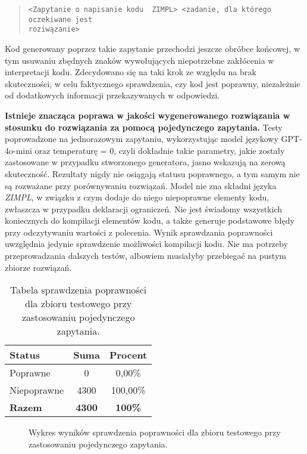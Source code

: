 \begin{quote}
\begin{verbatim}
<Zapytanie o napisanie kodu  ZIMPL> <zadanie, dla którego oczekiwane jest
roziwązanie>
\end{verbatim}
\end{quote}

Kod generowany poprzez takie zapytanie przechodzi jeszcze obróbce końcowej, w tym usuwaniu zbędnych znaków wywołujących niepotrzebne zakłócenia w interpretacji kodu. Zdecydowano się na taki krok ze względu na brak skuteczności, w celu faktycznego sprawdzenia, czy kod jest poprawny, niezależnie od dodatkowych informacji przekazywanych w odpowiedzi.

\textbf{Istnieje znacząca poprawa w jakości wygenerowanego rozwiązania w stosunku do rozwiązania za pomocą pojedynczego zapytania.} Testy poprowadzone na jednorazowym zapytaniu, wykorzystując model językowy GPT-4o-mini oraz temperaturę = 0, czyli dokładnie takie parametry, jakie zostały zastosowane w przypadku stworzonego generatora, jasno wskazują na zerową skuteczność. Rezultaty nigdy nie osiągają statusu poprawnego, a tym samym nie są rozważane przy porównywaniu rozwiązań. Model nie zna składni języka  \textit{ZIMPL}, w związku z czym dodaje do niego niepoprawne elementy kodu, zwłaszcza w przypadku deklaracji ograniczeń. Nie jest świadomy wszystkich koniecznych do kompilacji elementów kodu, a także generuje podstawowe błędy przy odczytywaniu wartości z polecenia. Wynik sprawdzania poprawności uwzględnia jedynie sprawdzenie możliwości kompilacji kodu. Nie ma potrzeby przeprowadzania dalszych testów, albowiem musiałyby przebiegać na pustym zbiorze rozwiązań.

\begin{table}[ht]
\caption{Tabela sprawdzenia poprawności dla zbioru testowego przy zastosowaniu pojedynczego zapytania.}\label{tab:tabela10}
\centering%
\begin{tabular}{|l|c|c|}
\hline
\textbf{Status} & \textbf{Suma} & \textbf{Procent} \\
\hline
Poprawne & 0 & 0,00\% \\
\hline
Niepoprawne & 4300 & 100,00\% \\
\hline
\textbf{Razem} & \textbf{4300} & \textbf{100\%} \\
\hline
\end{tabular}
\end{table}

\begin{figure}[H]
\centering
{}
\caption{Wykres wyników sprawdzenia poprawności dla zbioru testowego przy zastosowaniu pojedynczego zapytania.}\label{rys:plama2j}
\end{figure}

